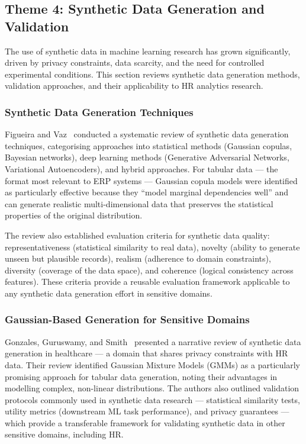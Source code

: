 \documentclass[12pt,a4paper]{article}
\begin{document}
\subsection{Theme 4: Synthetic Data Generation and Validation}
\label{sec:theme4}

The use of synthetic data in machine learning research has grown significantly, driven by privacy constraints, data scarcity, and the need for controlled experimental conditions. This section reviews synthetic data generation methods, validation approaches, and their applicability to HR analytics research.

\subsubsection{Synthetic Data Generation Techniques}

Figueira and Vaz~\cite{figueira2024synthetic} conducted a systematic review of synthetic data generation techniques, categorising approaches into statistical methods (Gaussian copulas, Bayesian networks), deep learning methods (Generative Adversarial Networks, Variational Autoencoders), and hybrid approaches. For tabular data --- the format most relevant to ERP systems --- Gaussian copula models were identified as particularly effective because they ``model marginal dependencies well'' and can generate realistic multi-dimensional data that preserves the statistical properties of the original distribution.

The review also established evaluation criteria for synthetic data quality: representativeness (statistical similarity to real data), novelty (ability to generate unseen but plausible records), realism (adherence to domain constraints), diversity (coverage of the data space), and coherence (logical consistency across features). These criteria provide a reusable evaluation framework applicable to any synthetic data generation effort in sensitive domains.

\subsubsection{Gaussian-Based Generation for Sensitive Domains}

Gonzales, Guruswamy, and Smith~\cite{gonzales2023synthetic} presented a narrative review of synthetic data generation in healthcare --- a domain that shares privacy constraints with HR data. Their review identified Gaussian Mixture Models (GMMs) as a particularly promising approach for tabular data generation, noting their advantages in modelling complex, non-linear distributions. The authors also outlined validation protocols commonly used in synthetic data research --- statistical similarity tests, utility metrics (downstream ML task performance), and privacy guarantees --- which provide a transferable framework for validating synthetic data in other sensitive domains, including HR.
\end{document}
